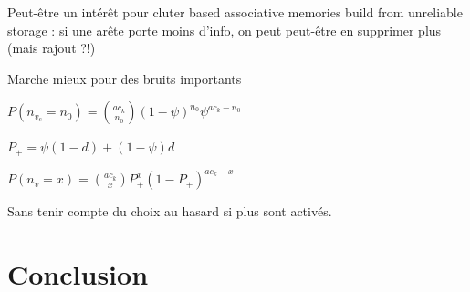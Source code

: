 \documentclass[english,11pt,twocolumn]{article}
\renewcommand{\ge}{\geqslant}
\theoremstyle{definition}
\begin{document}
	Peut-être un intérêt pour cluter based associative memories build from unreliable storage : si une arête porte moins d'info, on peut peut-être en supprimer plus (mais rajout ?!)
	

	Marche mieux pour des bruits importants
	
	$P(n_{v_c} = n_0) = {a c_k \choose n_0} (1-\psi)^{n_0} \psi ^ { a c_k - n_0 }$
	
	$P_+ = \psi (1 - d) + (1 - \psi) d$
	
	$P(n_v = x) = {a c_k \choose x} P_+^x (1-P_+)^{a c_k -x }$

	
	
	Sans tenir compte du choix au hasard si plus sont activés.
	

	\section{Conclusion}	
	
	
	\nocite{*}
         
\end{document}
